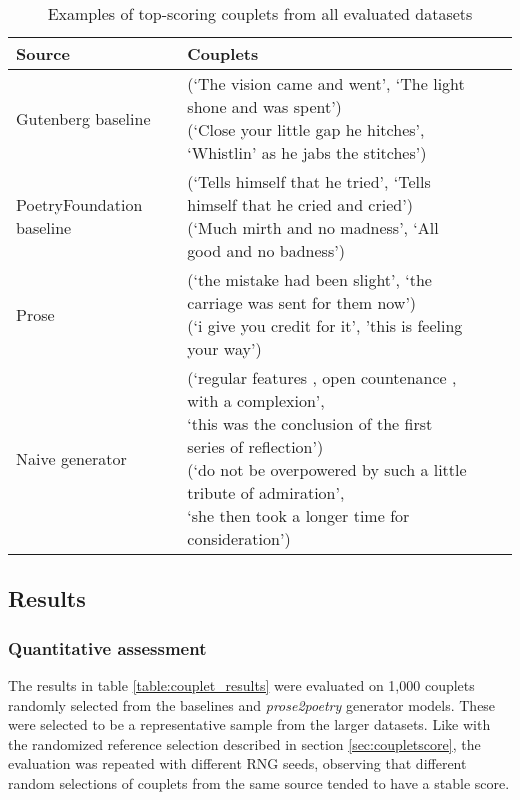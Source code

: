 \documentclass[11pt,a4paper]{article}
\begin{document}
\begin{table*}[ht]
\begin{tabular*}{\textwidth}{ll cc}
	\hline\hline
	Source & Couplets \\ [0.5ex]
	\hline\hline
	Gutenberg baseline & \makecell[l] {(`The vision came and went', `The light shone and was spent')\\(`Close your little gap he hitches', `Whistlin' as he jabs the stitches') } \\ [0.5ex]
	\hline
	PoetryFoundation baseline & \makecell[l]{(`Tells himself that he tried', `Tells himself that he cried and cried')\\(`Much mirth and no madness', `All good and no badness') } \\ [0.5ex]
	\hline
	Prose & \makecell[l]{(`the mistake had been slight', `the carriage was sent for them now')\\(`i give you credit for it', 'this is feeling your way')} \\ [0.5ex]
	\hline
	Naive generator & \makecell[l]{(`regular features , open countenance , with a complexion',\\`this was the conclusion of the first series of reflection')\\(`do not be overpowered by such a little tribute of admiration',\\`she then took a longer time for consideration')} \\ [0.5ex]
	\hline
\end{tabular*}
\caption{Examples of top-scoring couplets from all evaluated datasets}
\label{table:bestcouplets}
\end{table*}

\subsection{Results}
\label{sec:results}
\subsubsection{Quantitative assessment}

The results in table \ref{table:couplet_results} were evaluated on 1,000 couplets randomly selected from the baselines and \textit{prose2poetry} generator models. These were selected to be a representative sample from the larger datasets. Like with the randomized reference selection described in section \ref{sec:coupletscore}, the evaluation was repeated with different RNG seeds, observing that different random selections of couplets from the same source tended to have a stable score.
\end{document}
